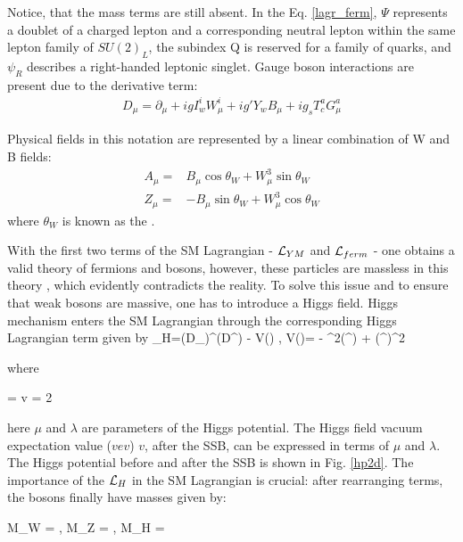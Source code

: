 \noindent Notice, that the mass terms are still absent. In the Eq. \ref{lagr_ferm}, $\Psi$ represents a doublet of a charged lepton and a corresponding neutral lepton within the same lepton family of $SU(2)_L$, the subindex Q is reserved for a family of quarks, and $\psi_R$ describes a right-handed leptonic singlet.  Gauge boson interactions are present due to the derivative term:
\begin{align}\label{cov_der2}
D_\mu = \partial_\mu + ig I_w^i W_\mu^i+ ig' Y_w B_\mu + ig_s T_c^a G_\mu^a
\end{align}

\noindent Physical fields in this notation are represented by a linear combination of W and B fields:
\begin{align}\label{neutral_fields}
A_\mu = &  B_\mu \cos\theta_W + W^3_\mu \sin\theta_W \\ 
Z_\mu = & -B_\mu \sin\theta_W + W^3_\mu \cos\theta_W \nonumber 
\end{align}
\noindent where $\theta_W$ is known as the  \cite{Weinberg:799984}.

With the first two terms of the SM Lagrangian -  $\mathcal{L}_{YM}$ and $\mathcal{L}_{ferm}$ - one obtains a valid theory of fermions and bosons, however, these particles are massless in this theory \cite{Wolf:2015kua}, which evidently contradicts the reality. To solve this issue and to ensure that weak bosons are massive, one has to introduce a Higgs field. Higgs mechanism enters the SM Lagrangian through the corresponding Higgs Lagrangian term given by 
\beqn\label{lagr_higgs}
\Lagr_H=(D_\mu\Phi)^\dagger(D^\mu\Phi) - V(\Phi) , \qquad V(\Phi)= - \mu^2(\Phi^\dagger\Phi) + (\Phi^\dagger\Phi)^2
\eeqn

\noindent where

\beqn\label{vev}
\Phi =  \quad {} \quad v = 2 
\eeqn

\noindent here $\mu$ and $\lambda$ are parameters of the Higgs potential. The Higgs field vacuum expectation value ($vev$) $v$, after the SSB, can be expressed in terms of $\mu$ and $\lambda$. The Higgs potential before and after the SSB is shown in Fig. \ref{hp2d}. The importance of the $\mathcal{L}_H$ in the SM Lagrangian is crucial: after rearranging terms, the bosons finally have masses given by:

\beqn
M_W = , \quad  M_Z = , \quad M_H = 
\eeqn


